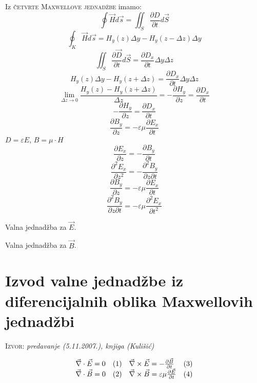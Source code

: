 \documentclass{report}
\begin{document}
{Iz \textsc{četvrte Maxwellove jednadžbe} imamo:
$$\oint {\vec{H} d \vec s} = \iint_S {\frac{\partial D}{\partial t} d \vec S}$$
$$\oint_K {\vec H d \vec s} = H_y(z) \Delta y - H_y (z - \Delta z) \Delta y$$
$$\iint_S {\frac{\partial \vec D}{\partial t} d \vec S} = \frac{\partial D_x}{\partial t} \Delta y \Delta z $$
$$H_y(z) \Delta y - H_y (z + \Delta z) = \frac{\partial D_x}{\partial t} \Delta y \Delta z$$
$$\mathop {\lim }\limits_{\Delta z \to 0 } \frac{H_y(z) - H_y(z + \Delta z)}{\Delta z} = - \frac{\partial H_y}{\partial z} = \frac{\partial D_x}{\partial t}$$
$$- \frac{\partial H_y}{\partial z} = \frac{\partial D_x}{\partial t}$$
$$\frac{\partial B_y}{\partial z} = - \varepsilon  \mu \frac{\partial E_x}{\partial t}$$
$D = \varepsilon E$, $B = \mu \cdot H$
$$\frac{\partial E_x}{\partial z} = - \frac{\partial B_y}{\partial t}$$
$$\frac{\partial ^2 E_x}{\partial z ^2} = - \frac{\partial ^2 B_y}{\partial z \partial t}$$
$$\frac{\partial B_y}{\partial z} = - \varepsilon \mu \frac{\partial E_x}{\partial t}$$
$$\frac{\partial ^2 B_y}{\partial z \partial t} = - \varepsilon \mu \frac{\partial ^2 E_x}{\partial t ^2}$$
\begin{center}
\end{center}
Valna jednadžba za $\vec E$.
\begin{center}
\end{center}
Valna jednadžba za $\vec B$.

\section{Izvod valne jednadžbe iz diferencijalnih oblika Maxwellovih jednadžbi}
\small \textsc{Izvor:} \textit{predavanje (5.11.2007.), knjiga (Kulišić)}

$$\begin{array}{*{20}c}
   {\vec \nabla  \cdot \vec E = 0} \hfill & {(1)} \hfill & {\vec \nabla  \times \vec E =  - \frac{{\partial \vec B}}
{{\partial t}}} \hfill & {(3)} \hfill  \\
   {\vec \nabla  \cdot \vec B = 0} \hfill & {(2)} \hfill & {\vec \nabla  \times \vec B = \varepsilon \mu \frac{{\partial \vec E}}
{{\partial t}}} \hfill & {(4)} \hfill  \\

 \end{array} $$

}
\end{document}
